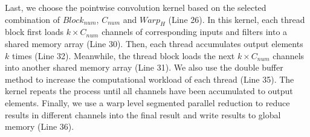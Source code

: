 Last, we choose the pointwise convolution kernel based on the selected combination of $Block_{num}$, $C_{num}$ and $Warp_H$ (Line 26). 
In this kernel, each thread block first loads $k \times C_{num}$ channels of corresponding inputs and filters into a shared memory array (Line 30). 
Then, each thread accumulates output elements $k$ times (Line 32). 
Meanwhile, the thread block loads the next $k \times C_{num}$ channels into another shared memory array (Line 31). 
We also use the double buffer method to increase the computational workload of each thread (Line 35).
The kernel repeats the process until all channels have been accumulated to output elements.
Finally, we use a warp level segmented parallel reduction to reduce results in different channels into the final result and write results to global memory (Line 36).  